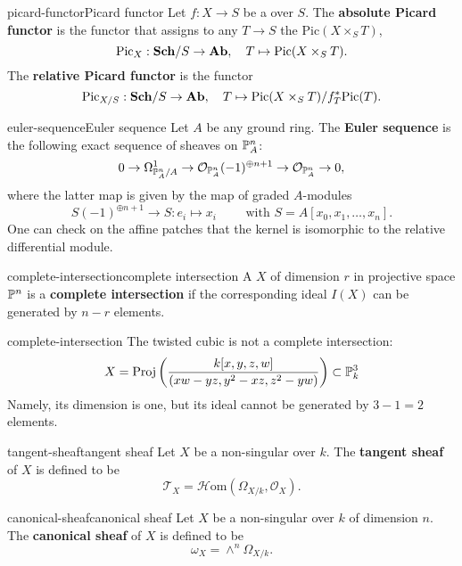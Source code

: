 \begin{topic}{picard-functor}{Picard functor}
    Let $f : X \to S$ be a  over $S$. The \textbf{absolute Picard functor} is the functor that assigns to any $T \to S$ the  $\text{Pic}(X \times_S T)$,
    \[ \textup{Pic}_X : \textbf{Sch}/S \to \textbf{Ab}, \quad T \mapsto \textup{Pic}(X \times_S T) . \]
    The \textbf{relative Picard functor} is the functor
    \[ \textup{Pic}_{X/S} : \textbf{Sch}/S \to \textbf{Ab}, \quad T \mapsto \textup{Pic}(X \times_S T) / f_T^* \textup{Pic}(T) . \]
\end{topic}

\begin{topic}{euler-sequence}{Euler sequence}
    Let $A$ be any ground ring. The \textbf{Euler sequence} is the following exact sequence of sheaves on $\mathbb{P}_A^n$:
    \[ 0 \rightarrow \Omega^1_{\mathbb{P}^n_A/A} \rightarrow \mathcal{O}_{\mathbb{P}_A^n}(-1)^{\oplus n + 1} \rightarrow \mathcal{O}_{\mathbb{P}_A^n} \rightarrow 0 , \]
    where the latter map is given by the map of graded $A$-modules
    \[ S(-1)^{\oplus n + 1} \to S : e_i \mapsto x_i \qquad \text{ with } S = A[x_0, x_1, \ldots, x_n] . \]
    One can check on the affine patches that the kernel is isomorphic to the relative differential module.
\end{topic}

\begin{topic}{complete-intersection}{complete intersection}
    A  $X$ of dimension $r$ in projective space $\mathbb{P}^n$ is a \textbf{complete intersection} if the corresponding ideal $I(X)$ can be generated by $n - r$ elements.
\end{topic}

\begin{example}{complete-intersection}
    The twisted cubic is not a complete intersection:
    \[ X = \text{Proj}\left(\frac{k[x, y, z, w]}{(xw - yz, y^2 - xz, z^2 - yw)}\right) \subset \mathbb{P}_k^3 \]
    Namely, its dimension is one, but its ideal cannot be generated by $3 - 1 = 2$ elements.
\end{example}

\begin{topic}{tangent-sheaf}{tangent sheaf}
    Let $X$ be a non-singular  over $k$. The \textbf{tangent sheaf} of $X$ is defined to be
    \[ \mathcal{T}_X = \mathcal{H}\text{om}(\Omega_{X/k}, \mathcal{O}_X) . \]
\end{topic}

\begin{topic}{canonical-sheaf}{canonical sheaf}
    Let $X$ be a non-singular  over $k$ of dimension $n$. The \textbf{canonical sheaf} of $X$ is defined to be
    \[ \omega_X = \wedge^n \Omega_{X/k} . \]
\end{topic}

